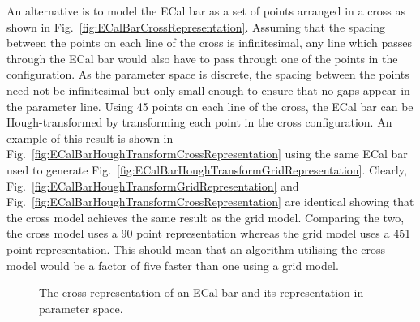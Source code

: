 An alternative is to model the ECal bar as a set of points arranged in a cross as shown in Fig.~\ref{fig:ECalBarCrossRepresentation}.  Assuming that the spacing between the points on each line of the cross is infinitesimal, any line which passes through the ECal bar would also have to pass through one of the points in the configuration.  As the parameter space is discrete, the spacing between the points need not be infinitesimal but only small enough to ensure that no gaps appear in the parameter line.  Using 45 points on each line of the cross, the ECal bar can be Hough-transformed by transforming each point in the cross configuration. An example of this result is shown in Fig.~\ref{fig:ECalBarHoughTransformCrossRepresentation} using the same ECal bar used to generate Fig.~\ref{fig:ECalBarHoughTransformGridRepresentation}.  Clearly, Fig.~\ref{fig:ECalBarHoughTransformGridRepresentation} and Fig.~\ref{fig:ECalBarHoughTransformCrossRepresentation} are identical showing that the cross model achieves the same result as the grid model.  Comparing the two, the cross model uses a 90 point representation whereas the grid model uses a 451 point representation.  This should mean that an algorithm utilising the cross model would be a factor of five faster than one using a grid model.
\begin{figure}%
  \centering
  \hspace{1em}
  \caption{The cross representation of an ECal bar and its representation in parameter space.}
  \label{fig:ECalBarCrossRepresentationAndHoughTransform}
\end{figure}

